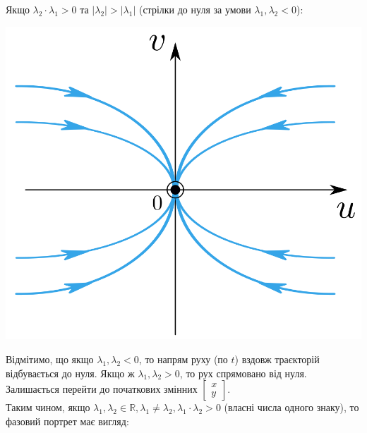 Якщо $ \lambda_2 \cdot \lambda_1 > 0$ та  $ \left| \lambda_2 \right| > \left| \lambda_1 \right|  $ (стрілки до нуля за умови $
 \lambda_1, \lambda_2 < 0$):

 \begin{center} \includegraphics[scale=0.3]{assets/lectures_recent-392ff5ad.png} \end{center}

 Відмітимо, що якщо $\lambda_1, \lambda_2 < 0$, то напрям руху (по $t$) вздовж траєкторій відбувається до нуля. Якщо ж $\lambda_1, \lambda_2 >0$, то рух спрямовано від нуля.\\

 Залишається перейти до початкових змінних $ \begin{bmatrix}
  x \\
   y
 \end{bmatrix}$.\\
Таким чином, якщо $\lambda_1 , \lambda_2 \in \mathbb{R}, \lambda_1 \neq \lambda_2, \lambda_1 \cdot \lambda_2 > 0$ (власні числа одного знаку), то фазовий портрет має вигляд:

